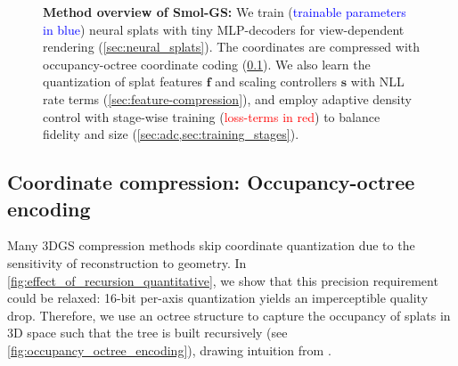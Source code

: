 \documentclass{article}
\def\vf{{\bm{f}}}
\def\vs{{\bm{s}}}
\newcommand{\ours}{Smol-GS\xspace}
\begin{document}
\begin{figure}[t!]
{\begin{minipage}{1.6\textwidth}
  \end{minipage}}
  \caption{\textbf{Method overview of \ours:} We train (\textcolor{blue}{trainable parameters in blue}) neural splats with tiny MLP-decoders for view-dependent rendering (\cref{sec:neural_splats}). The coordinates are compressed with occupancy-octree coordinate coding (\cref{sec:coordinate-compression}). We also learn the quantization of splat features $\vf$ and scaling controllers $\vs$ with NLL rate terms (\cref{sec:feature-compression}), and employ adaptive density control with stage-wise training (\textcolor{red}{loss-terms in red}) to balance fidelity and size (\cref{sec:adc,sec:training_stages}).}
  \label{fig:main_architecture}
  \vspace*{-1.5em}
\end{figure}


\subsection{Coordinate compression: Occupancy-octree encoding}
\label{sec:coordinate-compression}
%
Many 3DGS compression methods skip coordinate quantization due to the sensitivity of reconstruction to geometry. In \cref{fig:effect_of_recursion_quantitative}, we show that this precision requirement could be relaxed: 16-bit per-axis quantization yields an imperceptible quality drop. Therefore, we use an octree structure to capture the occupancy of splats in 3D space such that the tree is built recursively (see \cref{fig:occupancy_octree_encoding}), drawing intuition from \cite{schnabel2006octree,que2021voxelcontext,fu2022octattention,cui2023octformer}.
\end{document}
